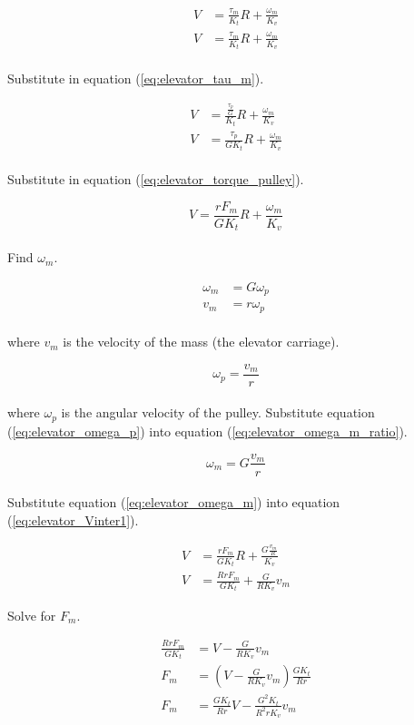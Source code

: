 \begin{align*}
  V &= \frac{\tau_m}{K_t} R + \frac{\omega_m}{K_v} \\
  V &= \frac{\tau_m}{K_t} R + \frac{\omega_m}{K_v}
\end{align*}
\\
Substitute in equation (\ref{eq:elevator_tau_m}).

\begin{align*}
  V &= \frac{\frac{\tau_p}{G}}{K_t} R + \frac{\omega_m}{K_v} \\
  V &= \frac{\tau_p}{GK_t} R + \frac{\omega_m}{K_v}
\end{align*}
\\
Substitute in equation (\ref{eq:elevator_torque_pulley}).

\begin{equation}
  V = \frac{rF_m}{GK_t} R + \frac{\omega_m}{K_v} \label{eq:elevator_Vinter1}
\end{equation}
\\
Find $\omega_m$.

\begin{align}
  \omega_m &= G \omega_p \label{eq:elevator_omega_m_ratio} \\
  v_m &= r \omega_p \nonumber
\end{align}
\\
where $v_m$ is the velocity of the mass (the elevator carriage).

\begin{equation}
  \omega_p = \frac{v_m}{r} \label{eq:elevator_omega_p}
\end{equation}
\\
where $\omega_p$ is the angular velocity of the pulley. Substitute equation
(\ref{eq:elevator_omega_p}) into equation (\ref{eq:elevator_omega_m_ratio}).

\begin{equation}
  \omega_m = G \frac{v_m}{r} \label{eq:elevator_omega_m}
\end{equation}
\\
Substitute equation (\ref{eq:elevator_omega_m}) into equation
(\ref{eq:elevator_Vinter1}).

\begin{align*}
  V &= \frac{rF_m}{GK_t} R + \frac{G \frac{v_m}{R}}{K_v} \\
  V &= \frac{RrF_m}{GK_t} + \frac{G}{RK_v} v_m
\end{align*}

Solve for $F_m$.

\begin{align}
  \frac{RrF_m}{GK_t} &= V - \frac{G}{RK_v} v_m \nonumber \\
  F_m &= \left(V - \frac{G}{RK_v} v_m\right) \frac{GK_t}{Rr} \nonumber \\
  F_m &= \frac{GK_t}{Rr} V - \frac{G^2K_t}{R^2 rK_v} v_m \label{eq:elevator_F_m}
\end{align}

